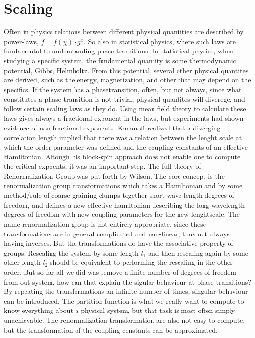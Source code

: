 \documentclass[a4paper]{article}
\begin{document}
\section{Scaling}
Often in physics relations between different physical quantities are described by power-laws, $f = f(\chi)\cdot g^{x}$. So also in statistical physics, where such laws are fundamental to understanding phase transitions.
In statistical physics, when studying a specific system, the fundamental quantity is some thermodynamic potential,  Gibbs, Helmholtz. From this potential, several other physical quantites are derived, such as the energy, magnetization, and other that may depend on the specifics. 
If the system has a phasetransition, often, but not always, since what constitutes a phase transition is not trivial, physical quantites will diverege, and follow certain scaling laws as they do. 
Using mean field theory to calculate these laws gives always a fractional exponent in the laws, but experiments had shown evidence of non-fractional exponents. 
Kadanoff realized that a diverging correlation length implied that there was a relation between the lenght scale at which the order parameter was defined and the coupling constants of an effective Hamiltonian. Altough his block-spin approach does not enable one to compute the critical expoents, it was an important step.
The full theory of Renormalization Group was put forth by Wilson.
The core concept is the renormalization group transformations which takes a Hamiltonian and by some method/rule of coarse-graining clumps together short wave-length degrees of freedom, and defines a new effective hamiltonian describing the long-wavelength degrees of freedom with new coupling parameters for the new lenghtscale.
The name renormalization group is not entirely appropriate, since these transformations are in general complicated and non-linear, thus not always having inverses. But the transformations do have the associative property of groups. Rescaling the system by some length $l_1$ and then rescaling again by some other length $l_2$ should be equivalent to performing the rescaling in the other order.
But so far all we did was remove a finite number of degrees of freedom from out system, how can that explain the sigular behaviour at phase transitions? By repeating the transformations an infinite number of times, singular behaviour can be introduced.
The partition function is what we really want to compute to know everything about a physical system, but that task is most often simply unachievable. The renormalization transformation are also not easy to compute, but the transformation of the coupling constants can be approximated.
\end{document}
